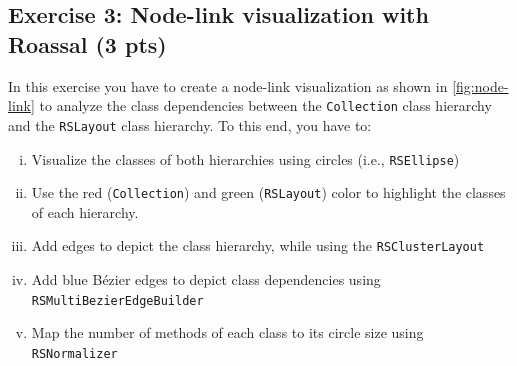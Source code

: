 \documentclass [11pt, a4wide, twoside]{article}
\begin{document}

\newpage

\subsection*{Exercise 3: Node-link visualization with Roassal (3 pts)}
In this exercise you have to create a node-link visualization as shown in \autoref{fig:node-link} to analyze the class dependencies between the \texttt{Collection} class hierarchy and the \texttt{RSLayout} class hierarchy. To this end, you have to:
\begin{enumerate}[i)]
\item Visualize the classes of both hierarchies using circles (i.e., \texttt{RSEllipse})
\item Use the red (\texttt{Collection}) and green (\texttt{RSLayout}) color to highlight the classes of each hierarchy.
\item Add edges to depict the class hierarchy, while using the \texttt{RSClusterLayout}
\item Add blue Bézier edges to depict class dependencies using \texttt{RSMultiBezierEdgeBuilder}
\item Map the number of methods of each class to its circle size using \texttt{RSNormalizer}
\end{enumerate}
\end{document}
